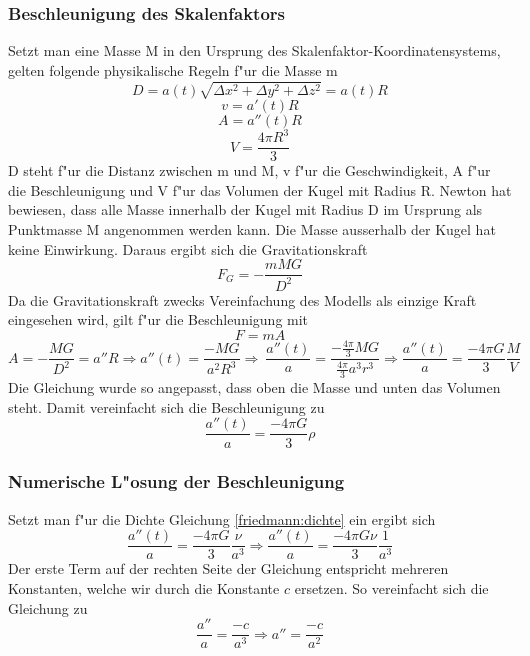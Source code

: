 \begin{refsection}
\subsubsection{Beschleunigung des Skalenfaktors}
Setzt man eine Masse M in den Ursprung des Skalenfaktor-Koordinatensystems, gelten folgende physikalische Regeln f"ur die Masse m 
\[D =  a(t) \sqrt{\Delta x^2 + \Delta y^2 + \Delta z^2}  = a(t) R\]
\[v = a'(t) R\]
\[A = a''(t) R\]
\[V = \frac{4 \pi R^3}{3}\]
D steht f"ur die Distanz zwischen m und M, v f"ur die Geschwindigkeit, A f"ur die Beschleunigung und V f"ur das Volumen der Kugel mit Radius R. Newton hat bewiesen, dass alle Masse innerhalb der Kugel mit Radius D im Ursprung als Punktmasse M angenommen werden kann. Die Masse ausserhalb der Kugel hat keine Einwirkung. Daraus ergibt sich die Gravitationskraft
\begin{equation}
F_G = -\frac{m M G}{D^2}
\end{equation}
Da die Gravitationskraft zwecks Vereinfachung des Modells als einzige Kraft eingesehen wird, gilt f"ur die Beschleunigung mit 
\[F = m A\]
\[A = - \frac{M G}{D^2} = a'' R \Rightarrow a''(t) = \frac{- M G}{a^2 R^3} \Rightarrow\ \frac{a''(t)}{a} = \frac{-\frac{4 \pi }{3} M G}{\frac{4 \pi}{3}a^3 r^3} \Rightarrow \frac{a''(t)}{a} = \frac{- 4 \pi G}{3} \frac{M}{V}\]
Die Gleichung wurde so angepasst, dass oben die Masse und unten das Volumen steht. Damit vereinfacht sich die Beschleunigung zu
\begin{equation}
\frac{a''(t)}{a} = \frac{- 4 \pi G}{3} \rho
\end{equation}
\subsubsection{Numerische L"osung der Beschleunigung}
Setzt man f"ur die Dichte Gleichung \ref{friedmann:dichte} ein ergibt sich
\[\frac{a''(t)}{a} = \frac{- 4 \pi G}{3} \frac{\nu}{a^3} \Rightarrow \frac{a''(t)}{a} = \frac{- 4 \pi G \nu}{3} \frac{1}{a^3}\]
Der erste Term auf der rechten Seite der Gleichung entspricht mehreren Konstanten, welche wir durch die Konstante $c$ ersetzen. So vereinfacht sich die Gleichung zu
\[\frac{a''}{a} = \frac{-c}{a^3} \Rightarrow a'' = \frac{-c}{a^2}\]
\end{refsection}

